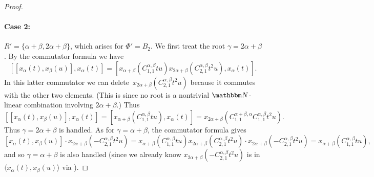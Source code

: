 \documentclass[10pt,a4paper]{article}
\theoremstyle{definition}
\newcommand{\N}{\mathbbm N}
\begin{document}
\begin{proof}
    \paragraph{Case 2:} $R' = \{ \alpha+\beta, 2\alpha + \beta\}$, which arises for $\Phi' = B_2$.  We first treat the root $\gamma = 2\alpha+\beta$.  By the commutator formula we have
    \[
        [[x_\alpha(t),x_\beta(u)],x_\alpha(t)] = [x_{\alpha+\beta}(C_{1,1}^{\alpha,\beta}tu) x_{2\alpha+\beta}(C_{2,1}^{\alpha,\beta}t^2u), x_\alpha(t)].
    \]
    In  this latter  commutator we can delete~$x_{2\alpha+\beta}(C_{2,1}^{\alpha,\beta}t^2u)$ because it commutes with the other two elements. (This is since no root is a nontrivial $\N$-linear combination involving $2\alpha+\beta$.)  Thus
    \begin{equation}    \label{C2a}
        [[x_\alpha(t),x_\beta(u)],x_\alpha(t)] = 
        [x_{\alpha+\beta}(C_{1,1}^{\alpha,\beta}tu), x_\alpha(t)] = 
        x_{2\alpha+\beta}(C_{1,1}^{\alpha+\beta,\alpha}C_{1,1}^{\alpha,\beta}t^2u).
    \end{equation}
    Thus $\gamma = 2\alpha+\beta$ is handled.  As for $\gamma = \alpha + \beta$, the commutator formula gives 
    \[
        [x_\alpha(t),x_\beta(u)]\cdot x_{2\alpha+\beta}(-C_{2,1}^{\alpha,\beta}t^2u) =  x_{\alpha+\beta}(C_{1,1}^{\alpha,\beta}tu)x_{2\alpha+\beta}(C_{2,1}^{\alpha,\beta}t^2u)\cdot x_{2\alpha+\beta}(-C_{2,1}^{\alpha,\beta}t^2u)
        = x_{\alpha+\beta}(C_{1,1}^{\alpha,\beta}tu),
    \]
    and so $\gamma = \alpha+\beta$ is also handled (since we already know $x_{2\alpha+\beta}(-C_{2,1}^{\alpha,\beta}t^2u)$ is in $\langle x_\alpha(t), x_\beta(u) \rangle$ via ).


\end{proof}
\end{document}
